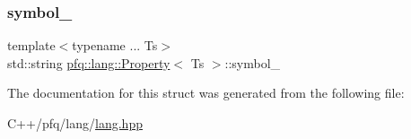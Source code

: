 \subsubsection{\texorpdfstring{symbol\+\_\+}{symbol\_}}
{\footnotesize\ttfamily template$<$typename ... Ts$>$ \\
std\+::string \hyperlink{structpfq_1_1lang_1_1Property}{pfq\+::lang\+::\+Property}$<$ Ts $>$\+::symbol\+\_\+}



The documentation for this struct was generated from the following file\+:\begin{DoxyCompactItemize}
\item 
C++/pfq/lang/\hyperlink{lang_8hpp}{lang.\+hpp}\end{DoxyCompactItemize}
